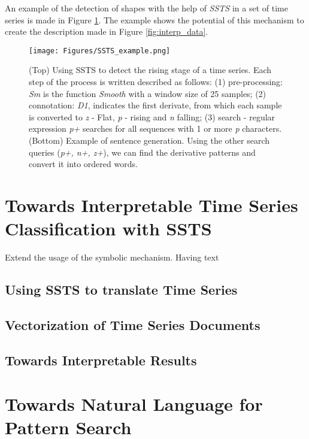 An example of the detection of shapes with the help of \textit{SSTS} in a set of time series is made in Figure \ref{fig:SSTS_example}. The example shows the potential of this mechanism to create the description made in Figure \ref{fig:interp_data}. 

\begin{figure}
    \centering
    \texttt{[image: Figures/SSTS\_example.png]}
    \caption{(Top) Using SSTS to detect the rising stage of a time series. Each step of the process is written described as follows: (1) pre-processing: \textit{Sm} is the function \textit{Smooth} with a window size of 25 samples; (2) connotation: \textit{D1}, indicates the first derivate, from which each sample is converted to \textit{z} - Flat, \textit{p} - rising and \textit{n} falling; (3) search - regular expression \textit{p+} searches for all sequences with 1 or more \textit{p} characters. (Bottom) Example of sentence generation. Using the other search queries (\textit{p+, n+, z+}), we can find the derivative patterns and convert it into ordered words.}
    \label{fig:SSTS_example}
\end{figure}


\section{Towards Interpretable Time Series Classification with SSTS}

Extend the usage of the symbolic mechanism. Having text 

\subsection{Using SSTS to translate Time Series}

\subsection{Vectorization of Time Series Documents}

\subsection{Towards Interpretable Results}


\section{Towards Natural Language for Pattern Search}

